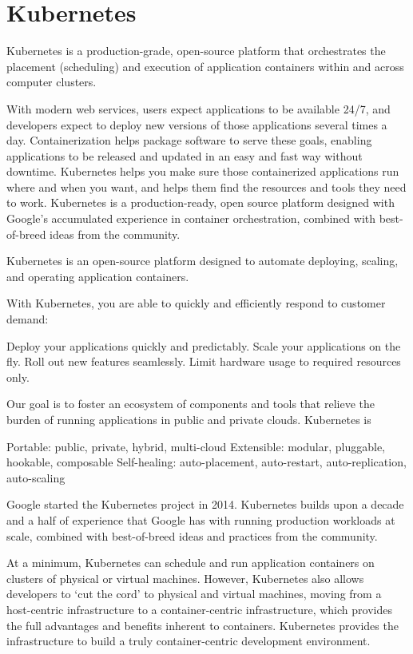 \chapter{Kubernetes}
\label{chp:kubernetes}

Kubernetes is a production-grade, open-source platform that orchestrates the placement (scheduling) and execution of application containers within and across computer clusters.


With modern web services, users expect applications to be available 24/7, and developers expect to deploy new versions of those applications several times a day. Containerization helps package software to serve these goals, enabling applications to be released and updated in an easy and fast way without downtime. Kubernetes helps you make sure those containerized applications run where and when you want, and helps them find the resources and tools they need to work. Kubernetes is a production-ready, open source platform designed with Google's accumulated experience in container orchestration, combined with best-of-breed ideas from the community.

Kubernetes is an open-source platform designed to automate deploying, scaling, and operating application containers.

With Kubernetes, you are able to quickly and efficiently respond to customer demand:

Deploy your applications quickly and predictably.
Scale your applications on the fly.
Roll out new features seamlessly.
Limit hardware usage to required resources only.

Our goal is to foster an ecosystem of components and tools that relieve the burden of running applications in public and private clouds.
Kubernetes is

Portable: public, private, hybrid, multi-cloud
Extensible: modular, pluggable, hookable, composable
Self-healing: auto-placement, auto-restart, auto-replication, auto-scaling

Google started the Kubernetes project in 2014. Kubernetes builds upon a decade and a half of experience that Google has with running production workloads at scale, combined with best-of-breed ideas and practices from the community.

At a minimum, Kubernetes can schedule and run application containers on clusters of physical or virtual machines. However, Kubernetes also allows developers to ‘cut the cord’ to physical and virtual machines, moving from a host-centric infrastructure to a container-centric infrastructure, which provides the full advantages and benefits inherent to containers. Kubernetes provides the infrastructure to build a truly container-centric development environment.


